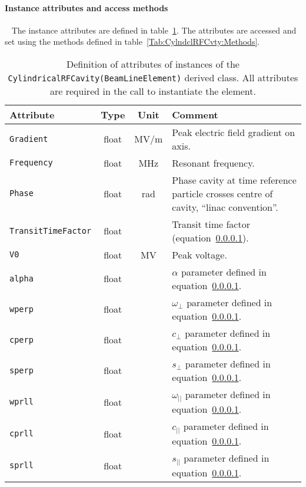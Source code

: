 \paragraph{Instance attributes and access methods} ~\newline
\label{SubSubSect:CylndclRFCvty:InstAttr}
\noindent
The instance attributes are defined in
table~\ref{Tab:CylndclRFCvty:Attributes}. 
The attributes are accessed and set using the methods defined in
table~\ref{Tab:CylndclRFCvty:Methods}.
\begin{table}[h]
  \caption{
    Definition of attributes of instances of
    the \texttt{CylindricalRFCavity(BeamLineElement)} derived class.
    All attributes are required in the call to instantiate the
    element.
  }
  \label{Tab:CylndclRFCvty:Attributes}
  \begin{center}
    \begin{tabular}{|l|c|c|p{10cm}|}
      \hline
      \textbf{Attribute}   & \textbf{Type} & \textbf{Unit} & \textbf{Comment}                    \\
      \hline
      \texttt{Gradient}          & float & MV/m  & Peak electric field gradient on axis.         \\
      \texttt{Frequency}         & float & MHz   & Resonant frequency.                           \\
      \texttt{Phase}             & float & rad   & Phase cavity at time reference particle crosses
                                                   centre of cavity, ``linac convention''.       \\
      \texttt{TransitTimeFactor} & float &       & Transit time factor (equation~\ref{}).        \\
      \texttt{V0}                & float & MV    & Peak voltage.                                 \\
      \texttt{alpha}             & float &       & $\alpha$ parameter defined in equation~\ref{}. \\
      \texttt{wperp}             & float &       & $\omega_\perp$ parameter defined in equation~\ref{}. \\
      \texttt{cperp}             & float &       & $c_\perp$ parameter defined in equation~\ref{}. \\
      \texttt{sperp}             & float &       & $s_\perp$ parameter defined in equation~\ref{}. \\
      \texttt{wprll}             & float &       & $\omega_{||}$ parameter defined in equation~\ref{}. \\
      \texttt{cprll}             & float &       & $c_{||}$ parameter defined in equation~\ref{}. \\
      \texttt{sprll}             & float &       & $s_{||}$ parameter defined in equation~\ref{}. \\
      \hline
    \end{tabular}
  \end{center}
\end{table}
